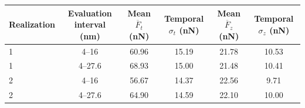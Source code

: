 \begin{tabular*}{\textwidth}{@{\extracolsep{\fill}}lccccc@{}}\toprule
Realization & Evaluation interval (nm) & Mean $\overline{F}_t$ (nN) & Temporal $\sigma_t$ (nN) & Mean $\overline{F}_z$ (nN) & Temporal $\sigma_z$ (nN)\\\midrule
1 & 4--16 & 60.96 & 15.19 & 21.78 & 10.53 \\
1 & 4--27.6 & 68.93 & 15.00 & 21.48 & 10.41 \\
2 & 4--16 & 56.67 & 14.37 & 22.56 & 9.71 \\
2 & 4--27.6 & 64.90 & 14.59 & 22.10 & 10.00 \\
\bottomrule
\end{tabular*}
